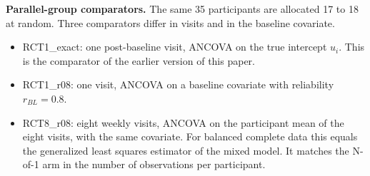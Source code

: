 \documentclass[
  11pt,
]{article}
\providecommand{\tightlist}{%
  \setlength{\itemsep}{0pt}\setlength{\parskip}{0pt}}
\begin{document}
\begin{table}[!h]
\centering
\caption{\label{tab:calib}Simulation parameters and their basis.}
\centering
{}
\end{table}

\textbf{Parallel-group comparators.} The same 35 participants are allocated 17 to 18 at random. Three comparators differ in visits and in the baseline covariate.

\begin{itemize}
\tightlist
\item
  RCT1\_exact: one post-baseline visit, ANCOVA on the true intercept \(u_i\). This is the comparator of the earlier version of this paper.
\item
  RCT1\_r08: one visit, ANCOVA on a baseline covariate with reliability \(r_{BL} = 0.8\).
\item
  RCT8\_r08: eight weekly visits, ANCOVA on the participant mean of the eight visits, with the same covariate. For balanced complete data this equals the generalized least squares estimator of the mixed model. It matches the N-of-1 arm in the number of observations per participant.
\end{itemize}
\end{document}
